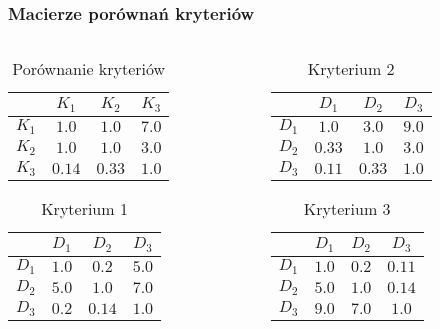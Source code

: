 \documentclass{beamer}
\begin{document}
\begin{frame}
\frametitle{Macierze porównań kryteriów}
	\begin{columns}
		\begin{column}{0.5\textwidth}
			\begin{table}
			\caption{Porównanie kryteriów}
				\begin{tabular}{c|c|c|c}
					&	$K_1$	&	$K_2$	&	$K_3$\\ \hline
				$K_1$	&	$1.0$	&	$1.0$	&	$7.0$\\ \hline
				$K_2$	&	$1.0$	&	$1.0$	&	$3.0$\\ \hline
				$K_3$	&	$0.14$	&	$0.33$	&	$1.0$
				\end{tabular}
			\end{table}
			\begin{table}
			\caption{Kryterium 1}
				\begin{tabular}{c|c|c|c}
					&	$D_1$	&	$D_2$	&	$D_3$\\ \hline
				$D_1$	&	$1.0$	&	$0.2$	&	$5.0$\\ \hline
				$D_2$	&	$5.0$	&	$1.0$	&	$7.0$\\ \hline
				$D_3$	&	$0.2$	&	$0.14$	&	$1.0$
				\end{tabular}
			\end{table}
		\end{column}
		\begin{column}{0.5\textwidth}
			\begin{table}
			\caption{Kryterium 2}
				\begin{tabular}{c|c|c|c}
					&	$D_1$	&	$D_2$	&	$D_3$\\ \hline
				$D_1$	&	$1.0$	&	$3.0$	&	$9.0$\\ \hline
				$D_2$	&	$0.33$	&	$1.0$	&	$3.0$\\ \hline
				$D_3$	&	$0.11$	&	$0.33$	&	$1.0$
				\end{tabular}
			\end{table}
			\begin{table}
			\caption{Kryterium 3}
				\begin{tabular}{c|c|c|c}
					&	$D_1$	&	$D_2$	&	$D_3$\\ \hline
				$D_1$	&	$1.0$	&	$0.2$	&	$0.11$\\ \hline
				$D_2$	&	$5.0$	&	$1.0$	&	$0.14$\\ \hline
				$D_3$	&	$9.0$	&	$7.0$	&	$1.0$
				\end{tabular}
			\end{table}
		\end{column}
	\end{columns}
\end{frame}
\end{document}
